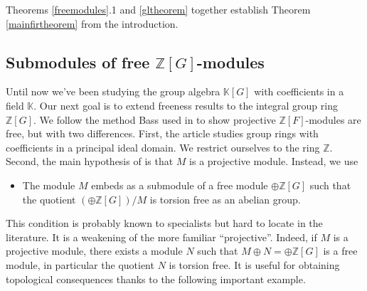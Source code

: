 \documentclass[11pt,letterpaper]{amsart}
\begin{document}
Theorems \ref{freemodules}.1 and \ref{gltheorem} together establish Theorem \ref{mainfirtheorem} from the introduction. 

\subsection{Submodules of free $\mathbb{Z} [G]$-modules\label{zsubsection}}
Until now we've been studying the group algebra $\mathbb{K} [G]$ with coefficients in a field $\mathbb{K}$. Our next goal is to extend freeness results to the integral group ring $\mathbb{Z} [G]$. We follow the method Bass used in \cite{bass} to show projective $\mathbb Z[F]$-modules are free,
but with two differences. First, the article \cite{bass} studies group rings with coefficients in a principal ideal domain. %
We restrict ourselves to the ring $\mathbb{Z}$. Second, the main hypothesis of \cite{bass} is that $M$ is a projective module. Instead, we use 


\begin{itemize}
\item[$(\star)$] The module $M$ embeds as a submodule of a free module $\oplus\mathbb{Z} [G]$ such that the quotient $(\oplus \mathbb{Z}[G])/M$ is torsion free as an abelian group.
\end{itemize}


This condition is probably known to specialists but hard to locate in the literature. 
It is a weakening of the more familiar ``projective''. Indeed, if $M$ is a projective module, there exists a module $N$ such that $M \oplus N = \oplus \mathbb{Z} [G]$ is a free module, in particular the quotient $N$ is torsion free. It is useful for obtaining topological consequences thanks to the following important example.
\end{document}
